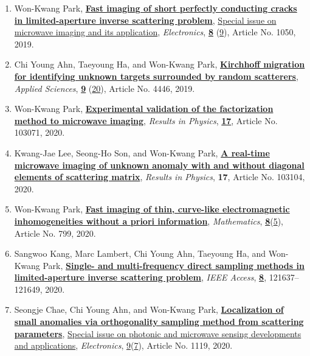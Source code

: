 \documentclass[10pt,A4]{article}
\begin{document}
\begin{enumerate}
\item\label{A-ELECT2019} Won-Kwang Park, \href{https://doi.org/10.3390/electronics8091050}{\textbf{Fast imaging of short perfectly conducting cracks in limited-aperture inverse scattering problem}}, \href{https://www.mdpi.com/journal/electronics/special_issues/ele_microwave}{Special issue on microwave imaging and its application}, \textit{Electronics}, \href{https://www.mdpi.com/2079-9292/8}{\textbf{8}} (\href{https://www.mdpi.com/2079-9292/8/9}{9}), Article No. 1050, 2019.
\item\label{A-APPLSCI2019} Chi Young Ahn, Taeyoung Ha, and Won-Kwang Park, \href{https://doi.org/10.3390/app9204446}{\textbf{Kirchhoff migration for identifying unknown targets surrounded by random scatterers}}, \textit{Applied Sciences}, \href{https://www.mdpi.com/2076-3417/9}{\textbf{9}} (\href{https://www.mdpi.com/2076-3417/9/20}{20}), Article No. 4446, 2019.
\item\label{A-RINP2020A} Won-Kwang Park, \href{https://doi.org/10.1016/j.rinp.2020.103071}{\textbf{Experimental validation of the factorization method to microwave imaging}}, \textit{Results in Physics}, \href{https://www.sciencedirect.com/science/journal/22113797/17/supp/C}{\textbf{17}}, Article No. 103071, 2020.
\item\label{A-RINP2020B} Kwang-Jae Lee, Seong-Ho Son, and Won-Kwang Park, \href{https://doi.org/10.1016/j.rinp.2020.103104}{\textbf{A real-time microwave imaging of unknown anomaly with and without diagonal elements of scattering matrix}}, \textit{Results in Physics}, \textbf{17}, Article No. 103104, 2020.
\item\label{A-MATH2020} Won-Kwang Park, \href{https://doi.org/10.3390/math8050799}{\textbf{Fast imaging of thin, curve-like electromagnetic inhomogeneities without a priori information}}, \textit{Mathematics}, \href{https://www.mdpi.com/2227-7390/8}{\textbf{8}}(\href{https://www.mdpi.com/2227-7390/8/5}{5}), Article No. 799, 2020.
\item\label{A-IEEEACCESS2020} Sangwoo Kang, Marc Lambert, Chi Young Ahn, Taeyoung Ha, and Won-Kwang Park, \href{https://doi.org/10.1109/ACCESS.2020.3006341}{\textbf{Single- and multi-frequency direct sampling methods in limited-aperture inverse scattering problem}}, \textit{IEEE Access}, \href{https://ieeexplore.ieee.org/xpl/tocresult.jsp?isnumber=8948470}{\textbf{8}}, 121637--121649, 2020.
\item\label{A-ELECTRONICS2020} Seongje Chae, Chi Young Ahn, and Won-Kwang Park, \href{https://doi.org/10.3390/electronics9071119}{\textbf{Localization of small anomalies via orthogonality sampling method from scattering parameters}}, \href{https://www.mdpi.com/journal/electronics/special_issues/Photonic}{Special issue on photonic and microwave sensing developments and applications}, \textit{Electronics}, \href{https://www.mdpi.com/2079-9292/9}{9}(\href{https://www.mdpi.com/2079-9292/9/7}{7}), Article No. 1119, 2020.

\end{enumerate}
\end{document}
